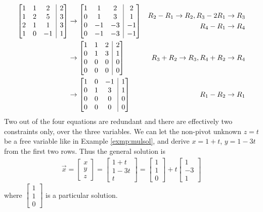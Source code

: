 \begin{solution}
\begin{align*}
\left[\begin{array}{@{}ccc|c@{}}
1 & 1 & 2 & 2 \\
1 & 2 & 5 & 3 \\
2 & 1 & 1 & 3 \\
1 & 0 & -1 & 1
\end{array}\right] 
& \to 
\left[\begin{array}{@{}ccc|c@{}}
1 & 1 & 2 & 2 \\
0 & 1 & 3 & 1 \\
0 & -1 & -3 & -1\\
0 & -1 & -3 & -1
\end{array}\right] 
& \begin{aligned}
R_2 - R_1 \to R_2, R_3 - 2R_1 \to R_3 \\
R_4 - R_1 \to R_4
\end{aligned}\\ 
& \to 
\left[\begin{array}{@{}ccc|c@{}}
1 & 1 & 2 & 2 \\
0 & 1 & 3 & 1 \\
0 & 0 & 0 & 0 \\
0 & 0 & 0 & 0
\end{array}\right] 
& R_3 + R_2 \to R_3, R_4 + R_2 \to R_4 \\
& \to 
\left[\begin{array}{@{}ccc|c@{}}
1 & 0 & -1 & 1 \\
0 & 1 & 3 & 1 \\
0 & 0 & 0 & 0 \\
0 & 0 & 0 & 0
\end{array}\right] 
& R_1- R_2 \to R_1 
\end{align*}
Two out of the four equations are redundant and there are effectively two constraints only, over the three variables. We can let the non-pivot unknown $z = t$ be a free variable like in Example \ref{exmp:mulsol}, and derive $x = 1+t$, $y = 1-3t$ from the first two rows. Thus the general solution is
\begin{align*}
\vec{x} = 
\begin{bmatrix}
x \\
y \\
z
\end{bmatrix}
=
\begin{bmatrix}
1+t \\
1-3t \\
t
\end{bmatrix}
=
\begin{bmatrix}
1 \\
1 \\
0
\end{bmatrix}
+ t
\begin{bmatrix}
1 \\
-3 \\
1
\end{bmatrix}
\end{align*}
where $\begin{bmatrix}
1 \\
1 \\
0    
\end{bmatrix}$
is a particular solution.
\end{solution}


